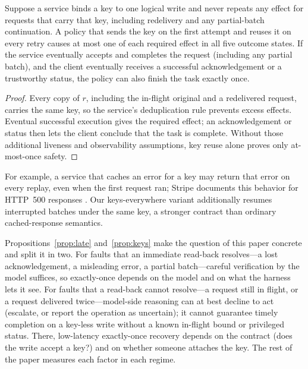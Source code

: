 \begin{proposition}
\label{prop:keys}
Suppose a service binds a key to one logical write and never repeats any effect for requests that carry that
key, including redelivery and any partial-batch continuation. A policy that sends the key on the first attempt
and reuses it on every retry causes at most one of each required effect in all five outcome states. If the
service eventually accepts and completes the request (including any partial batch), and the client eventually
receives a successful acknowledgement or a trustworthy status, the policy can also finish the task exactly once.
\end{proposition}

\begin{proof}
Every copy of $r$, including the in-flight original and a redelivered request, carries the same key, so the
service's deduplication rule prevents excess effects. Eventual successful execution gives the required effect;
an acknowledgement or status then lets the client conclude that the task is complete. Without those additional
liveness and observability assumptions, key reuse alone proves only at-most-once safety.
\end{proof}

For example, a service that caches an error for a key may return that error on every replay, even when the first
request ran; Stripe documents this behavior for HTTP~500 responses \citep{stripe_idempotent}. Our
keys-everywhere variant additionally resumes interrupted batches under the same key, a stronger contract than
ordinary cached-response semantics.

Propositions~\ref{prop:late} and~\ref{prop:keys} make the question of this paper concrete and split it in two.
For faults that an immediate read-back resolves---a lost acknowledgement, a misleading error, a partial
batch---careful verification by the model suffices, so exactly-once depends on the model and on what the harness
lets it see. For faults that a read-back cannot resolve---a request still in flight, or a request delivered
twice---model-side reasoning can at best decline to act (escalate, or report the operation as uncertain); it
cannot guarantee timely completion on a key-less write without a known in-flight bound or privileged status.
There, low-latency exactly-once recovery depends on the contract (does the write accept a key?) and on whether
someone attaches the key. The rest of the paper measures each factor in each regime.
